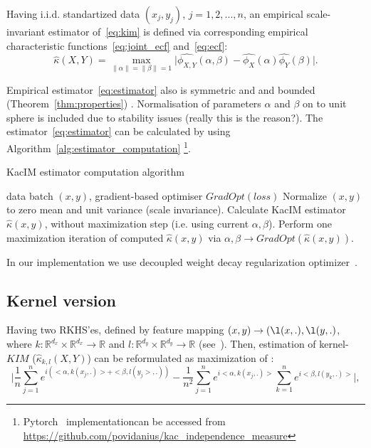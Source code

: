 \documentclass{article}
\begin{document}
Having i.i.d. standartized data $(x_{j}, y_{j})$, $j = 1,2,...,n$, an empirical scale-invariant estimator of~\eqref{eq:kim} is defined via corresponding empirical characteristic functions~\eqref{eq:joint_ecf} and~\eqref{eq:ecf}:
\begin{equation}
\label{eq:estimator}
    \hat{\kappa}(X,Y) = \max_{\|\alpha\| = \|\beta\| = 1} \vert \widehat{\phi_{X,Y}}(\alpha,\beta)  - \widehat{\phi_{X}}(\alpha) \widehat{\phi_{Y}}(\beta) \vert.
\end{equation}

\noindent Empirical estimator~\eqref{eq:estimator} also is symmetric and and bounded (Theorem~\ref{thm:properties}) . Normalisation of parameters $\alpha$ and $\beta$ on to unit sphere is included due to stability issues (really this is the reason?). The  estimator~\eqref{eq:estimator} can be calculated by using Algorithm~\ref{alg:estimator_computation} \footnote{ Pytorch~\cite{NEURIPS2019_9015} implementationcan be accessed from \url{https://github.com/povidanius/kac_independence_measure}}. 

\begin{algorithm}
\caption{KacIM estimator computation algorithm}\label{alg:estimator_computation}
\begin{algorithmic}
\Require data batch $(x,y)$, gradient-based optimiser $GradOpt(loss)$
\State Normalize $(x,y)$ to zero mean and unit variance (scale invariance).
\State Calculate KacIM estimator $\hat{\kappa}(x,y)$, without maximization step (i.e. using current $\alpha, \beta$).
\State Perform one maximization iteration of computed $\hat{\kappa}(x,y)$ via $\alpha, \beta \rightarrow GradOpt(\hat{\kappa}(x,y))$.
\end{algorithmic}
\end{algorithm}
In our implementation we use decoupled weight decay regularization optimizer~\cite{Loshchilov2019DecoupledWD}.

\subsection{Kernel version}

Having two RKHS'es, defined by feature mapping $(x,y) \rightarrow (\l(x,.), \l(y,.)$, where $k: \mathbb{R}^{d_{x}} \times \mathbb{R}^{d_{x}} \rightarrow \mathbb{R}$ and $l: \mathbb{R}^{d_{y}} \times \mathbb{R}^{d_{y}} \rightarrow \mathbb{R}$ (see~\cite{10.5555/3279302}). Then, estimation of kernel-$KIM$ ($\hat{\kappa}_{k,l} (X,Y)$) can be reformulated as maximization of :
\begin{equation}
\label{eq:kernel_estimator}
    \vert \frac{1}{n} \sum_{j=1}^{n} e^{i(<\alpha, k(x_{j},.)> + <\beta, l(y_{j}>,.)) } - \frac{1}{n^2} \sum_{j=1}^{n} e^{i <\alpha, k(x_{j},.)>}\sum_{k=1}^{n} e^{i<\beta, l(y_{k},.)>}\vert,
\end{equation}
\end{document}
